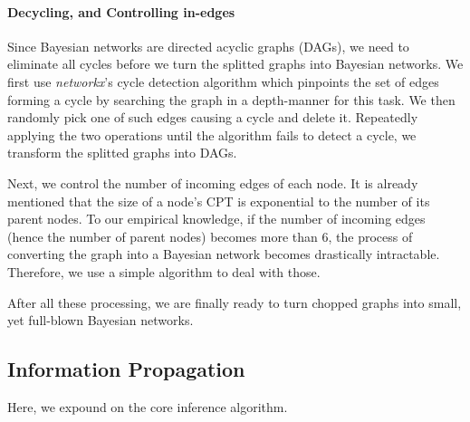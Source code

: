 \paragraph{Decycling, and Controlling in-edges}

Since Bayesian networks are directed acyclic graphs (DAGs), we need to eliminate
all cycles before we turn the splitted graphs into Bayesian networks. We first
use \emph{networkx}'s cycle
detection algorithm which pinpoints the set of edges forming a cycle by
searching the graph in a depth-manner for this task. We then randomly pick one of
such edges causing a cycle and delete it. Repeatedly applying the two
operations until the algorithm fails to detect a cycle, we transform the
splitted graphs into DAGs.      %

Next, we control the number of incoming edges of each node. It is already
mentioned that the size of a node's CPT is exponential to the number of its
parent nodes. To our empirical knowledge, if the number of incoming edges (hence
the number of parent nodes) becomes more than 6, the process of converting the
graph into a Bayesian network becomes drastically intractable. Therefore, we
use a simple algorithm to deal with those. 

After all these processing, we are finally ready to turn chopped graphs into
small, yet full-blown Bayesian networks.

\subsection{Information Propagation}

Here, we expound on the core inference algorithm. 